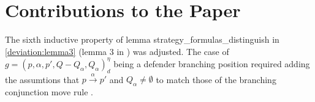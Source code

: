 \section{Contributions to the Paper}
The sixth inductive property of lemma strategy\_formulas\_distinguish in \ref{deviation:lemma3} (lemma 3 in \cite{bisping2023lineartimebranchingtime}) was adjusted. The case of $g=(p,\alpha ,p', Q- Q_\alpha, Q_\alpha)_d^\eta$ being a defender branching position required adding the assumtions that $p \overset{\alpha}{\longrightarrow} p'$ and $Q_\alpha \neq \emptyset$ to match those of the branching conjunction move rule \cite[cf. p. 13]{bisping2023lineartimebranchingtime}. 